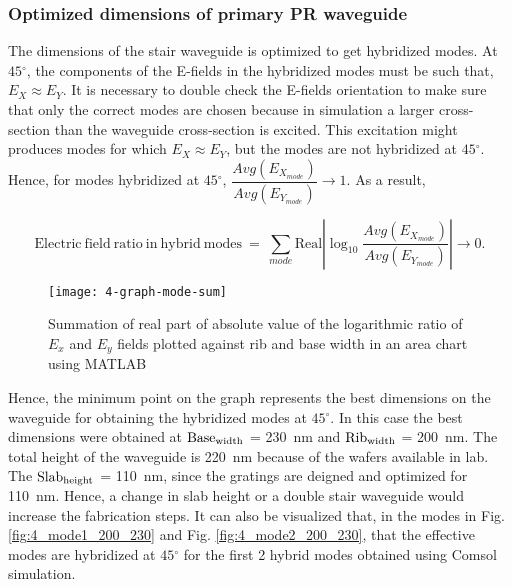 \documentclass[../report.tex]{subfiles}
\begin{document}
\subsubsection{Optimized dimensions of primary PR waveguide}
The dimensions of the stair waveguide is optimized to get hybridized modes. At $45{^\circ}$, the components of the E-fields in the hybridized modes must be such that, $E_X \approx E_Y$. It is necessary to double check the E-fields orientation to make sure that only the correct modes are chosen because in simulation a larger cross-section than the waveguide cross-section is excited. This excitation might produces modes for which $E_X \approx E_Y$, but the modes are not hybridized at $45{^\circ}$. Hence, for modes hybridized at $45{^\circ}$, $\dfrac {Avg(E_{X_{mode}})} {Avg(E_{Y_{mode}})} \rightarrow 1$. As a result, 

\begin{equation}\label{eq:wg_dim_eq}
\mathrm{Electric ~ field ~ ratio ~ in ~ hybrid ~ modes} ~ = ~ \sum _{mode}\mathrm{Real}\left| \log _{10}\dfrac {Avg(E_{X_{mode}})} {Avg(E_{Y_{mode}})}\right| \rightarrow 0. 
\end{equation}

\begin{figure}[H] %
	\centering
	\texttt{[image: 4-graph-mode-sum]}
	\caption{Summation of real part of absolute value of the logarithmic ratio of $E_x$ and $E_y$ fields plotted against rib and base width in an area chart using MATLAB}
	\label{fig:4_graph_mode_sum}
\end{figure}  
\noindent Hence, the minimum point on the graph represents the best dimensions on the waveguide for obtaining the hybridized modes at $45{^\circ}$. In this case the best dimensions were obtained at $\mathrm{Base_{width}}$ = \SI{230}{\nano \meter} and $\mathrm{Rib_{width}}$ = \SI{200}{\nano \meter}. The total height of the waveguide is \SI{220}{\nano \meter} because of the wafers available in lab. The $\mathrm{Slab_{height}}$ = \SI{110}{\nano \meter}, since the gratings are deigned and optimized for \SI{110}{\nano \meter}. Hence, a change in slab height or a double stair waveguide would increase the fabrication steps. It can also be visualized that, in the modes in Fig. \ref{fig:4_mode1_200_230} and Fig. \ref{fig:4_mode2_200_230}, that the effective modes are hybridized at $45{^\circ}$ for the first 2 hybrid modes obtained using Comsol simulation. 
\end{document}
